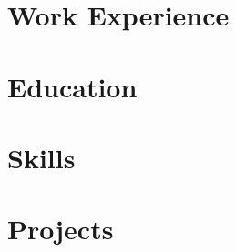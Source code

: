 \documentclass[letter,10pt]{article}
\begin{document}
% 

\section{Work Experience}


\section{Education}


\section{Skills}


\section{Projects}



% 
\end{document}
